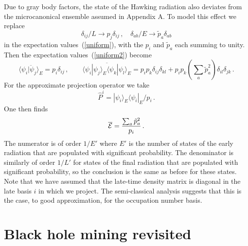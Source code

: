 \documentclass[12pt]{article}
\newcommand{\sect}[1]{\section{#1}\setcounter{equation}{0}}
\begin{document}
 Due to gray body factors, the state of the Hawking radiation also deviates from the microcanonical ensemble assumed in Appendix A. To model
 this effect we replace
\begin{equation}
\delta_{ij}/L \to p_j \delta_{ij}\,,\quad \delta_{ab}/E \to \tilde p_a \delta_{ab}
\end{equation}
 in the expectation values~(\ref{uniform}), with the $p_i$ and $\tilde p_a$ each summing to unity.  Then the expectation values~(\ref{uniform2}) become
\begin{equation}
\overline{  \langle  \psi_i |  \psi_j\rangle_E } = p_i {\delta_{ij} }  \,, \qquad \overline{   \langle  \psi_i |  \psi_j\rangle_E   \langle  \psi_k |  \psi_l\rangle_E  } =
p_i p_k \delta_{ij} \delta_{kl}  + p_i p_k ( {\textstyle \sum_{a}  \tilde p_a^2} ) \delta_{il} \delta_{jk}\,.
\end{equation}
For the approximate projection operator we take
\begin{equation}
\hat P^i = |\psi_i\rangle_E \langle \psi_i |_E/p_i \,.
\end{equation}
One then finds
\begin{equation}
\overline{ \cal E  } =
\frac{ \textstyle\sum_{a}  \tilde p_a^2}{p_i }  \,.
\end{equation}
The numerator is of order $1/E'$ where $E'$ is the number of states of the early radiation that are populated with significant probability.  The denominator is similarly of order $1/L'$ for states of the final radiation that are populated with significant probability, so the conclusion is the same as before for these states.  Note that we have assumed that the late-time density matrix is diagonal in the late basis $i$ in which we project.  The semi-classical analysis \cite{Hawking:1974sw} suggests that this is the case, to good approximation, for the occupation number basis.



\sect{Black hole mining revisited}
\label{mining}
\end{document}
